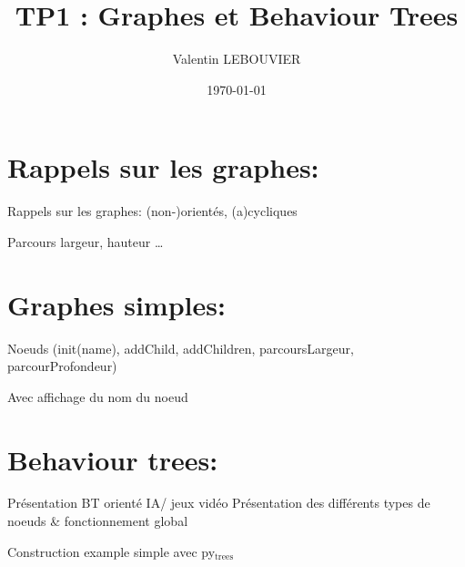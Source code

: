 \documentclass{article}
\author{Valentin LEBOUVIER}
\date{\today}
\title{TP1 : Graphes et Behaviour Trees}
\begin{document}
\maketitle
\tableofcontents


\section{Rappels sur les graphes:}
\label{sec-1}
Rappels sur les graphes: (non-)orientés, (a)cycliques

Parcours largeur, hauteur \ldots{}


\section{Graphes simples:}
\label{sec-2}
Noeuds (init(name), addChild, addChildren, parcoursLargeur, parcourProfondeur)

Avec affichage du nom du noeud

\section{Behaviour trees:}
\label{sec-3}
Présentation BT orienté IA/ jeux vidéo
Présentation des différents types de noeuds \& fonctionnement global

Construction example simple avec py$_{\text{trees}}$
\end{document}
